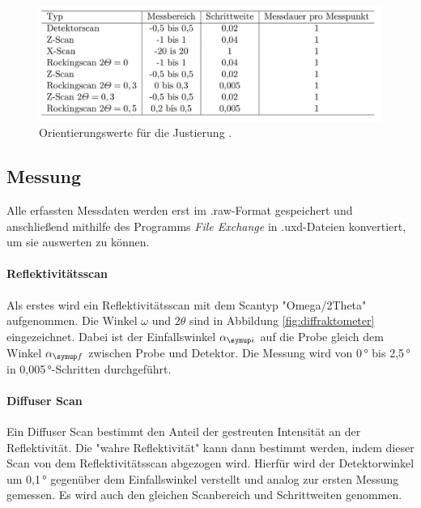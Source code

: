 \begin{figure}[H]
  \centering
  \includegraphics[scale=0.35]{table.JPG}
  \caption{Orientierungswerte für die Justierung \cite{V44}.}
  \label{tab:justage}
\end{figure}











\subsection{Messung}
Alle erfassten Messdaten werden erst im .raw-Format gespeichert und anschließend 
mithilfe des Programms \textit{File Exchange} in .uxd-Dateien konvertiert, um sie auswerten zu können.

\paragraph{Reflektivitätsscan}
Als erstes wird ein Reflektivitätsscan mit dem Scantyp "Omega/2Theta" aufgenommen. Die Winkel $\omega$ und $2\theta$ sind in 
Abbildung \ref{fig:diffraktometer} eingezeichnet.
Dabei ist der Einfallswinkel $\alpha\idx{i}$ auf die Probe gleich dem Winkel $\alpha\idx{f}$ zwischen Probe und Detektor.
Die Messung wird von 0\,° bis 2,5\,° in 0,005\,°-Schritten durchgeführt.

\paragraph{Diffuser Scan}
Ein Diffuser Scan bestimmt den Anteil der gestreuten Intensität an der Reflektivität. Die "wahre Reflektivität"
kann dann bestimmt werden, indem dieser Scan von dem Reflektivitätsscan abgezogen wird.
Hierfür wird der Detektorwinkel um 0,1\,° gegenüber dem Einfallswinkel verstellt und analog zur ersten Messung gemessen.
Es wird auch den gleichen Scanbereich und Schrittweiten genommen.





